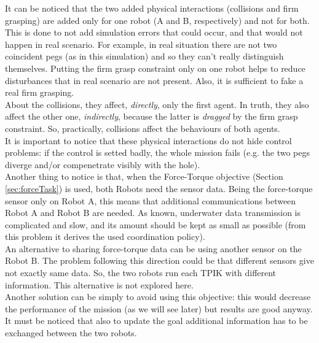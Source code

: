 \noindent It can be noticed that the two added physical interactions (collisions and firm grasping) are added only for one robot (A and B, respectively) and not for both.\\
This is done to not add simulation errors that could occur, and that would not happen in real scenario. For example, in real situation there are not two coincident pegs (as in this simulation) and so they can't really distinguish themselves. Putting the firm grasp constraint only on one robot helps to reduce disturbances that in real scenario are not present. Also, it is sufficient to fake a real firm grasping.\\
About the collisions, they affect, \textit{directly}, only the first agent. In truth, they also affect the other one, \textit{indirectly}, because the latter is \textit{dragged} by the firm grasp constraint. So, practically, collisions affect the behaviours of both agents.\\
It is important to notice that these physical interactions do not hide control problems: if the control is setted badly, the whole mission fails (e.g. the two pegs diverge and/or compenetrate visibly with the hole).\\

Another thing to notice is that, when the Force-Torque objective (Section \ref{sec:forceTask}) is used, both Robots need the sensor data. Being the force-torque sensor only on Robot A, this means that additional communications between Robot A and Robot B are needed. As known, underwater data transmission is complicated and slow, and its amount should be kept as small as possible (from this problem it derives the used coordination policy).\\ 

An alternative to sharing force-torque data can be using another sensor on the Robot B. The problem following this direction could be that different sensors give not exactly same data. So, the two robots run each TPIK with different information. This alternative is not explored here.\\

Another solution can be simply to avoid using this objective: this would decrease the performance of the mission (as we will see later) but results are good anyway.\\

It must be noticed that also to update the goal additional information has to be exchanged between the two robots. 

